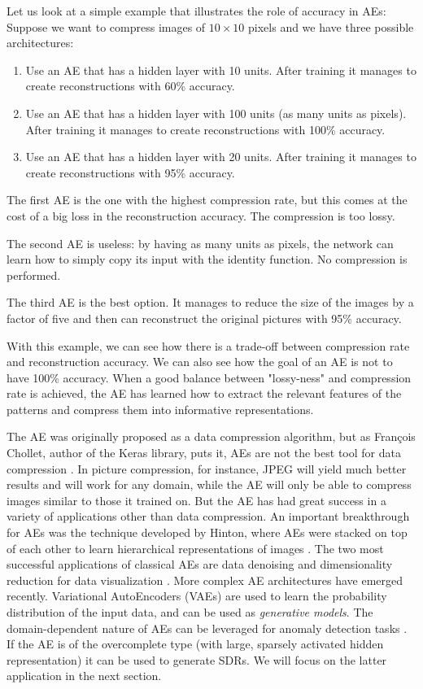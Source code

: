 \documentclass[runningheads]{llncs}
\begin{document}
Let us look at a simple example that illustrates the role of accuracy in AEs: Suppose we want to compress images of $10 \times 10$ pixels and we have three possible architectures:
\begin{enumerate}
    \item Use an AE that has a hidden layer with 10 units. After training it manages to create reconstructions with 60\% accuracy.
    \item Use an AE that has a hidden layer with 100 units (as many units as pixels). After training it manages to create reconstructions with 100\% accuracy.
    \item Use an AE that has a hidden layer with 20 units. After training it manages to create reconstructions with 95\% accuracy.
\end{enumerate}

The first AE is the one with the highest compression rate, but this comes at the cost of a big loss in the reconstruction accuracy. The compression is too lossy.

The second AE is useless: by having as many units as pixels, the network can learn how to simply copy its input with the identity function. No compression is performed.

The third AE is the best option. It manages to reduce the size of the images by a factor of five and then can reconstruct the original pictures with 95\% accuracy.

With this example, we can see how there is a trade-off between compression rate and reconstruction accuracy. We can also see how the goal of an AE is not to have 100\% accuracy. When a good balance between "lossy-ness" and compression rate is achieved, the AE has learned how to extract the relevant features of the patterns and compress them into informative representations.
\newline

The AE was originally proposed as a data compression algorithm, but as François Chollet, author of the Keras library, puts it, AEs are not the best tool for data compression \cite{chollet2016building}. In picture compression, for instance, JPEG will yield much better results and will work for any domain, while the AE will only be able to compress images similar to those it trained on.
But the AE has had great success in a variety of applications other than data compression.
An important breakthrough for AEs was the technique developed by Hinton, where AEs were stacked on top of each other to learn hierarchical representations of images \cite{krizhevsky2011using}.
The two most successful applications of classical AEs are data denoising \cite{cho2013simple}  and dimensionality reduction for data visualization \cite{hinton2006reducing}.
More complex AE architectures have emerged recently. Variational AutoEncoders (VAEs) \cite{kingma2013auto} are used to learn the probability distribution of the input data, and can be used as \textit{generative models}. The domain-dependent nature of AEs can be leveraged for anomaly detection tasks \cite{sakurada2014anomaly,an2015variational}. If the AE is of the overcomplete type (with large, sparsely activated hidden representation) it can be used to generate SDRs. We will focus on the latter application in the next section.
\end{document}
